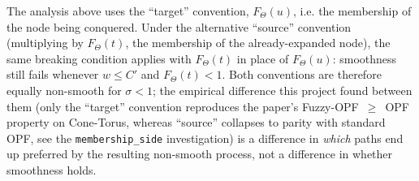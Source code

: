 The analysis above uses the ``target'' convention, $F_\Theta(u)$, i.e. the membership of the node being conquered. Under the alternative ``source'' convention (multiplying by $F_\Theta(t)$, the membership of the already-expanded node), the same breaking condition applies with $F_\Theta(t)$ in place of $F_\Theta(u)$: smoothness still fails whenever $w \le C'$ and $F_\Theta(t) < 1$. Both conventions are therefore equally non-smooth for $\sigma < 1$; the empirical difference this project found between them (only the ``target'' convention reproduces the paper's Fuzzy-OPF~$\ge$~OPF property on Cone-Torus, whereas ``source'' collapses to parity with standard OPF, see the \texttt{membership\_side} investigation) is a difference in \emph{which} paths end up preferred by the resulting non-smooth process, not a difference in whether smoothness holds.
